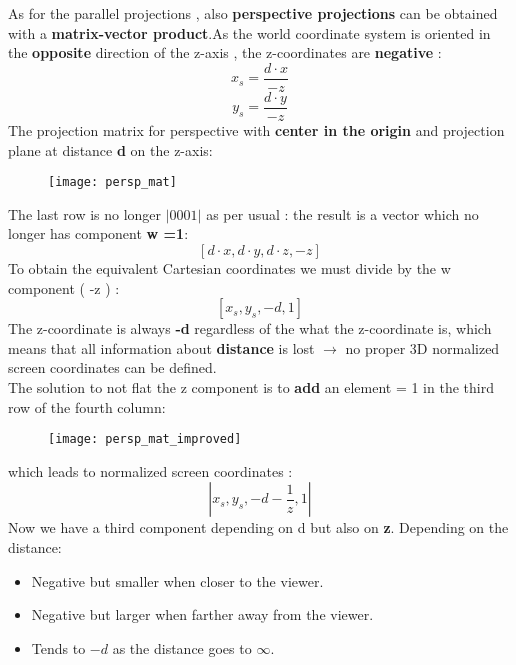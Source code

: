As for the parallel projections , also \textbf{perspective projections} can be obtained with a \textbf{matrix-vector product}.As the world coordinate system is oriented  in the \textbf{opposite} direction of the z-axis , the z-coordinates are \textbf{negative} :
\[
\boxed{x_s = \frac{d \cdot x}{-z}}
\]
\[
\boxed{y_s = \frac{d \cdot y}{-z}}
\]
The projection matrix for perspective with \textbf{center in the origin} and projection plane at distance \textbf{d} on the z-axis:
\begin{figure}[H]
 \centering
  \texttt{[image: persp\_mat]}
\end{figure}
The last row is no longer $|0 0 0 1|$ as per usual : the result is a vector which no longer has component \textbf{w =1}:
\[
\boxed{[d\cdot x, d\cdot y ,d\cdot z, -z]}
\]
To obtain the equivalent Cartesian coordinates we must divide by the w component ( -z ) : 
$$ [x_s,y_s,-d,1] $$
The z-coordinate is always \textbf{-d} regardless of the what the z-coordinate is, which means that all information about \textbf{distance} is lost $\to$ no proper 3D normalized screen coordinates can be defined.\\
The solution to not flat the z component is to \textbf{add} an element = 1 in the third row of the fourth column:
\begin{figure}[H]
 \centering
  \texttt{[image: persp\_mat\_improved]}
\end{figure}
which leads to normalized screen coordinates :
$$ |x_s,y_s,-d-\frac{1}{z},1|$$
Now we have a third component depending on d but also on \textbf{z}.
Depending on the distance:
\begin{itemize}
\item Negative but smaller when closer to the viewer.
\item Negative but larger when farther away from the viewer.
\item Tends to $-d$ as the distance goes to $\infty$.
\end{itemize}

